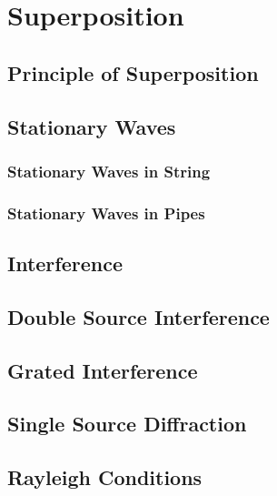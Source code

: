 \documentclass[../main]{subfiles}
\begin{document}
\section{Superposition}

\subsection{Principle of Superposition}


\subsection{Stationary Waves}

\subsubsection{Stationary Waves in String}

\subsubsection{Stationary Waves in Pipes}

\subsection{Interference}

\subsection{Double Source Interference}

\subsection{Grated Interference}

\subsection{Single Source Diffraction}

\subsection{Rayleigh Conditions}
\end{document}

